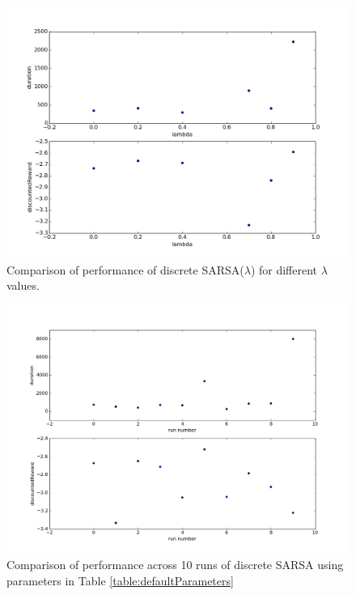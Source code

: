 \documentclass{article}
\begin{document}
\begin{figure}
\centering
\includegraphics[scale=0.5]{figures/discreteSARSALamComparison.png}
\caption{Comparison of performance of discrete SARSA($\lambda$) for different $\lambda$ values.}

\label{figures/discreteSARSALamComparison.png}
\end{figure}

\begin{figure}
\centering
\includegraphics[scale=0.5]{figures/sarsaMultiple.png}
\caption{Comparison of performance across 10 runs of discrete SARSA using parameters in Table \ref{table:defaultParameters}}
\label{figures/sarsaMultiple.png}
\end{figure}
\end{document}
